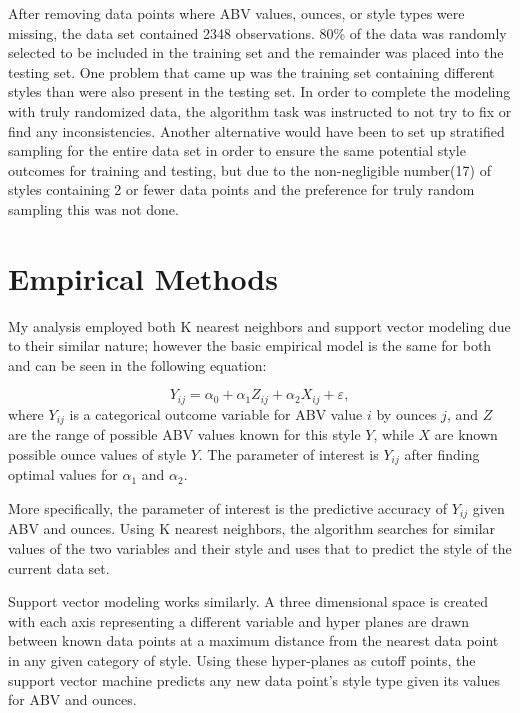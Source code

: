 \documentclass[12pt,english]{article}
\begin{document}
After removing data points where ABV values, ounces, or style types were missing, the data set contained 2348 observations.  80\% of the data was randomly selected to be included in the training set and the remainder was placed into the testing set.  One problem that came up was the training set containing different styles than were also present in the testing set.  In order to complete the modeling with truly randomized data, the algorithm task was instructed to not try to fix or find any inconsistencies.  Another alternative would have been to set up stratified sampling for the entire data set in order to ensure the same potential style outcomes for training and testing, but due to the non-negligible number(17) of styles containing 2 or fewer data points and the preference for truly random sampling this was not done.  


\section{Empirical Methods}\label{sec:methods}
My analysis employed both K nearest neighbors and support vector modeling due to their similar nature; however the basic empirical model is the same for both and can be seen in the following equation:

\begin{equation}
\label{eq:1}
Y_{ij}=\alpha_{0} + \alpha_{1}Z_{ij} + \alpha_{2} X_{ij} + \varepsilon,
\end{equation}
where $Y_{ij}$ is a categorical outcome variable for ABV value $i$ by ounces $j$, and $Z$ are the range of possible ABV values known for this style $Y$, while $X$ are known possible ounce values of style $Y$. The parameter of interest is $Y_{ij}$ after finding optimal values for $\alpha_{1}$ and $\alpha_{2}$.

More specifically, the parameter of interest is the predictive accuracy of $Y_{ij}$ given ABV and ounces. Using K nearest neighbors, the algorithm searches for similar values of the two variables and their style and uses that to predict the style of the current data set.  

Support vector modeling works similarly.  A three dimensional space is created with each axis representing a different variable and hyper planes are drawn between known data points at a maximum distance from the nearest data point in any given category of style.  Using these hyper-planes as cutoff points, the support vector machine predicts any new data point's style type given its values for ABV and ounces.
\end{document}
